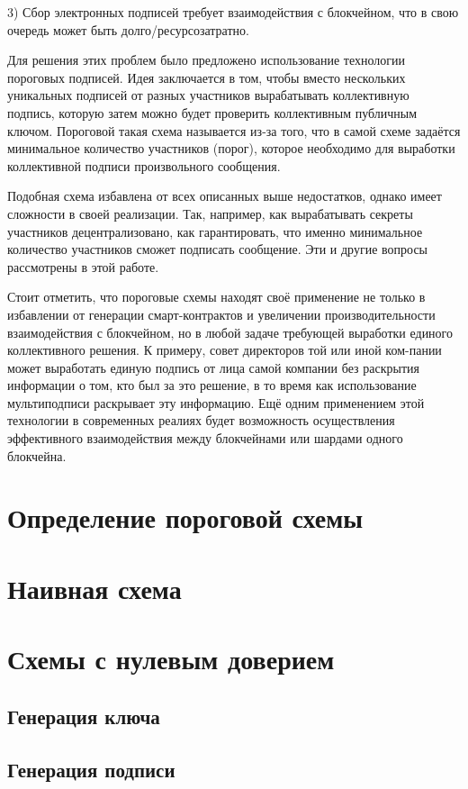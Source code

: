 \documentclass[a4paper,12pt]{article}
\begin{document}
	3)	Сбор электронных подписей требует взаимодействия с блокчейном, что в свою очередь может быть долго/ресурсозатратно.
	
	Для решения этих проблем было предложено использование технологии пороговых подписей. Идея заключается в том, чтобы вместо нескольких уникальных подписей от разных участников вырабатывать коллективную подпись, которую затем можно будет проверить коллективным публичным ключом. Пороговой такая схема называется из-за того, что в самой схеме задаётся минимальное количество участников (порог), которое необходимо для выработки коллективной подписи произвольного сообщения.
	
	Подобная схема избавлена от всех описанных выше недостатков, однако имеет сложности в своей реализации. Так, например, как вырабатывать секреты участников децентрализовано, как гарантировать, что именно минимальное количество участников сможет подписать сообщение. Эти и другие вопросы рассмотрены в этой работе.
	
	Стоит отметить, что пороговые схемы находят своё применение не только в избавлении от генерации смарт-контрактов и увеличении производительности взаимодействия с блокчейном, но в любой задаче требующей выработки единого коллективного решения. К примеру, совет директоров той или иной ком-пании может выработать единую подпись от лица самой компании без раскрытия информации о том, кто был за это решение, в то время как использование мультиподписи раскрывает эту информацию. Ещё одним применением этой технологии в современных реалиях будет возможность осуществления эффективного взаимодействия между блокчейнами или шардами одного блокчейна.
	
	
	\section{Определение пороговой схемы}
	\section{Наивная схема}
	\section{Схемы с нулевым доверием}
		\subsection{Генерация ключа}
		\subsection{Генерация подписи}
\end{document}
